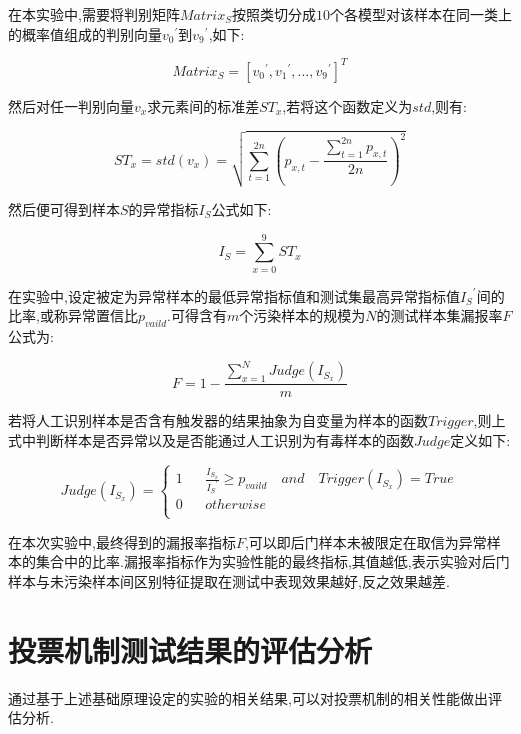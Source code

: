 在本实验中,需要将判别矩阵$Matrix_S$按照类切分成$10$个各模型对该样本在同一类上的概率值组成的判别向量${v_0}^{'}$到${v_9}^{'}$,如下:

\begin{equation}
Matrix_{S} = [{v_0}^{'},{v_1}^{'},...,{v_9}^{'}]^{T} 
\end{equation}

然后对任一判别向量${v_x}$求元素间的标准差${ST}_x$,若将这个函数定义为$std$,则有:

\begin{equation}
{ST}_x=std(v_x)=\sqrt{\sum_{t=1}^{2n} (p_{x,t}-\frac{\sum_{t=1}^{2n} p_{x,t}}{2n})^{2}} 
\end{equation}

然后便可得到样本$S$的异常指标$I_S$公式如下:

\begin{equation}
I_S=\sum_{x=0}^{9} {ST}_x 
\end{equation}

在实验中,设定被定为异常样本的最低异常指标值和测试集最高异常指标值${I_S}^{'}$间的比率,或称异常置信比$p_{vaild}$.可得含有$m$个污染样本的规模为$N$的测试样本集漏报率$F$公式为:

\begin{equation}
F=1-\frac{\sum_{x=1}^{N} Judge(I_{S_x})}{m} 
\end{equation}


若将人工识别样本是否含有触发器的结果抽象为自变量为样本的函数$Trigger$,则上式中判断样本是否异常以及是否能通过人工识别为有毒样本的函数$Judge$定义如下:

\begin{equation}
Judge(I_{S_x})=\left\{
\begin{array}{rcl}
1 && {\frac{I_{S_x}}{{I_S}^{'}} \geq p_{vaild} \quad and \quad Trigger(I_{S_x})=True}\\
0 && {otherwise}\\
\end{array}\right.
\end{equation}

在本次实验中,最终得到的漏报率指标$F$,可以即后门样本未被限定在取信为异常样本的集合中的比率.漏报率指标作为实验性能的最终指标,其值越低,表示实验对后门样本与未污染样本间区别特征提取在测试中表现效果越好,反之效果越差.

\section{投票机制测试结果的评估分析}
通过基于上述基础原理设定的实验的相关结果,可以对投票机制的相关性能做出评估分析.

